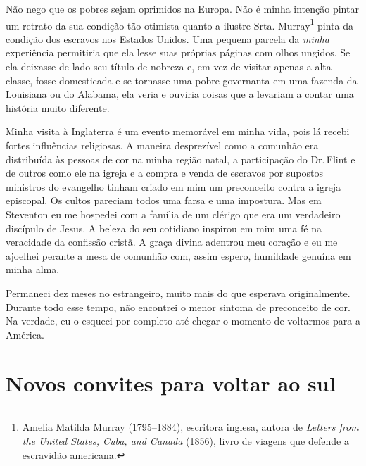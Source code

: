Não nego que os pobres sejam oprimidos
na Europa. Não é minha intenção pintar um retrato da sua condição tão
otimista quanto a ilustre Srta. Murray\footnote{Amelia Matilda Murray (1795--1884), escritora inglesa, autora de
  \emph{Letters from the United States, Cuba, and Canada} (1856), livro
  de viagens que defende a escravidão americana.} pinta da condição dos
escravos nos Estados Unidos. Uma pequena parcela da \emph{minha}
experiência permitiria que ela lesse suas próprias páginas com olhos
ungidos. Se ela deixasse de lado seu título de nobreza e, em vez de
visitar apenas a alta classe, fosse domesticada e se tornasse uma pobre
governanta em uma fazenda da Louisiana ou do Alabama, ela veria e
ouviria coisas que a levariam a contar uma história muito diferente.

Minha
visita à Inglaterra é um evento memorável em minha vida, pois lá recebi
fortes influências religiosas. A maneira desprezível como a comunhão era
distribuída às pessoas de cor na minha região natal, a participação do
Dr.\,Flint e de outros como ele na igreja e a compra e venda de escravos
por supostos ministros do evangelho tinham criado em mim um preconceito
contra a igreja episcopal. Os cultos pareciam todos uma farsa e uma
impostura. Mas em Steventon eu me hospedei com a família de um clérigo
que era um verdadeiro discípulo de Jesus. A beleza do seu cotidiano
inspirou em mim uma fé na veracidade da confissão cristã. A graça divina
adentrou meu coração e eu me ajoelhei perante a mesa de comunhão com,
assim espero, humildade genuína em minha alma.

Permaneci dez meses no estrangeiro,
muito mais do que esperava originalmente. Durante todo esse tempo, não
encontrei o menor sintoma de preconceito de cor. Na verdade, eu o
esqueci por completo até chegar o momento de voltarmos para a América.

\chapter*{Novos convites para voltar ao sul}


